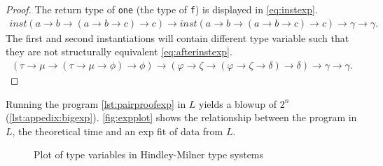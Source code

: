 \documentclass[11pt,oneside,a4paper]{report}
\begin{document}
\begin{proof}
    The return type of \texttt{one} (the type of \texttt{f}) is displayed in \autoref{eq:instexp}.
    \begin{align}
        \textit{inst}(a \rightarrow b \rightarrow (a \rightarrow b \rightarrow c) \rightarrow c) \rightarrow \textit{inst}(a \rightarrow b \rightarrow (a \rightarrow b \rightarrow c) \rightarrow c) \rightarrow \gamma \rightarrow \gamma.
        \label{eq:instexp}
    \end{align}
    The first and second instantiations will contain different type variable such that they are not structurally equivalent \autoref{eq:afterinstexp}.
    \begin{align}
        (\tau \rightarrow \mu \rightarrow (\tau \rightarrow \mu \rightarrow \phi) \rightarrow \phi) \rightarrow (\varphi \rightarrow \zeta \rightarrow (\varphi \rightarrow \zeta \rightarrow \delta) \rightarrow \delta) \rightarrow \gamma \rightarrow \gamma.
        \label{eq:afterinstexp}
    \end{align}
\end{proof}
Running the program \autoref{lst:pairproofexp} in $L$ yields a blowup of $2^n$ (\autoref{lst:appedix:bigexp}).
\autoref{fig:expplot} shows the relationship between the program in $L$, the theoretical time and an exp fit of data from $L$.
\begin{figure}[ht]
    \centering
{}
    \caption{Plot of type variables in Hindley-Milner type systems}
    \label{fig:expplot}
\end{figure}
\end{document}
